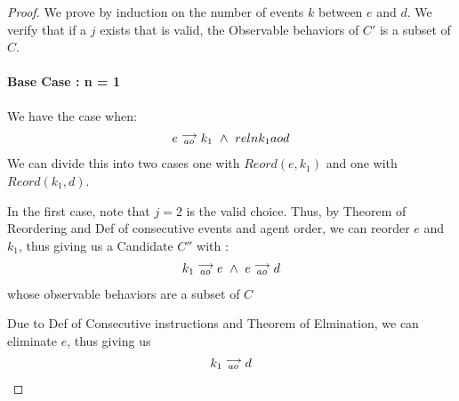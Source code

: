 \begin{proof}
    We prove by induction on the number of events $k$ between $e$ and $d$. We verify that if a $j$ exists that is valid, the Observable behaviors of $C'$ is a subset of $C$.

    \paragraph{Base Case : n = 1}

        We have the case when:
        \begin{align*}
            e\stackrel{\longrightarrow}{_{ao}}k_1 \ \wedge \ reln{k_1}{ao}{d}
        \end{align*}
        We can divide this into two cases one with $Reord(e, k_1)$ and one with $Reord(k_1, d)$.

        In the first case, note that $j=2$ is the valid choice. Thus, by Theorem of Reordering and Def of consecutive events and agent order, we can reorder $e$ and $k_1$, thus giving us a Candidate $C''$ with :
        \begin{align*}
            k_1\stackrel{\longrightarrow}{_{ao}}e \ \wedge \ e\stackrel{\longrightarrow}{_{ao}}d
        \end{align*}  
        whose observable behaviors are a subset of $C$

        Due to Def of Consecutive instructions and Theorem of Elmination, we can eliminate $e$, thus giving us 
        \begin{align*}
            k_1\stackrel{\longrightarrow}{_{ao}}d
        \end{align*} 

\end{proof}